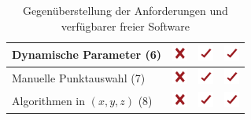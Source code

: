 \begin{table}
\begin{tabularx}{\textwidth}{|p{7cm}|X|X|X|}
    Dynamische Parameter (6)						& \includegraphics[width=0.5cm]{./img/no.pdf}				& \includegraphics[width=0.5cm]{./img/yes.pdf}  		  		& \includegraphics[width=0.5cm]{./img/yes.pdf}  \\ \hline
    Manuelle Punktauswahl (7)		 				& \includegraphics[width=0.5cm]{./img/no.pdf}				& \includegraphics[width=0.5cm]{./img/yes.pdf}		  		& \includegraphics[width=0.5cm]{./img/yes.pdf} \\ \hline
    Algorithmen in $(x, y, z)$ (8)					& \includegraphics[width=0.5cm]{./img/no.pdf}& \includegraphics[width=0.5cm]{./img/yes.pdf}  &  \includegraphics[width=0.5cm]{./img/yes.pdf} \\ \hline
    
    \bottomrule
    \end{tabularx}
    \caption {Gegenüberstellung der Anforderungen und verfügbarer freier Software}
    \label{table:anforderungen}
\end{table}

